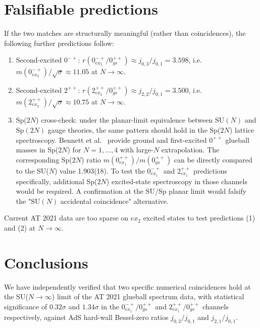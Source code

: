 \documentclass[reprint,prd,amsmath,amssymb,nofootinbib,superscriptaddress]{revtex4-2}
\newcommand{\jbz}[2]{j_{#1,#2}}      %
\begin{document}
\section{Falsifiable predictions}
\label{sec:predictions}

If the two matches are structurally meaningful (rather than coincidences), the following further predictions follow:

\begin{enumerate}
  \item Second-excited $0^{-+}$: $r(0^{-+}_{ex_2}/0^{++}_{gs}) \approx \jbz{0}{3}/\jbz{0}{1} = 3.598$, i.e.\ $m(0^{-+}_{ex_2})/\sqrt{\sigma} \approx 11.05$ at $N \to \infty$.
  \item Second-excited $2^{++}$: $r(2^{++}_{ex_2}/0^{++}_{gs}) \approx \jbz{2}{2}/\jbz{0}{1} = 3.500$, i.e.\ $m(2^{++}_{ex_2})/\sqrt{\sigma} \approx 10.75$ at $N \to \infty$.
  \item Sp($2N$) cross-check: under the planar-limit equivalence between $\mathrm{SU}(N)$ and $\mathrm{Sp}(2N)$ gauge theories, the same pattern should hold in the Sp($2N$) lattice spectroscopy. Bennett et al.~\cite{Bennett2020} provide ground and first-excited $0^{++}$ glueball masses in Sp(2$N$) for $N=1,\ldots,4$ with large-$N$ extrapolation. The corresponding Sp($2N$) ratio $m(0^{++}_{ex_1})/m(0^{++}_{gs})$ can be directly compared to the SU($N$) value 1.903(18). To test the $0^{-+}_{ex_1}$ and $2^{++}_{ex_1}$ predictions specifically, additional Sp($2N$) excited-state spectroscopy in those channels would be required. A confirmation at the SU/Sp planar limit would falsify the "$\mathrm{SU}(N)$ accidental coincidence" alternative.
\end{enumerate}

Current AT 2021 data are too sparse on $ex_2$ excited states to test predictions (1) and (2) at $N \to \infty$.

\section{Conclusions}
\label{sec:conclusions}

We have independently verified that two specific numerical coincidences hold at the SU($N \to \infty$) limit of the AT 2021 glueball spectrum data, with statistical significance of $0.32\sigma$ and $1.34\sigma$ in the $0^{-+}_{ex_1}/0^{++}_{gs}$ and $2^{++}_{ex_1}/0^{++}_{gs}$ channels respectively, against AdS hard-wall Bessel-zero ratios $\jbz{0}{2}/\jbz{0}{1}$ and $\jbz{2}{1}/\jbz{0}{1}$.
\end{document}
